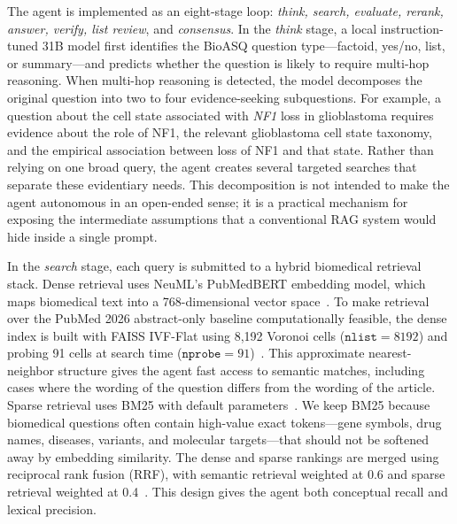 \documentclass[sigconf,nonacm]{acmart}
\begin{document}
The agent is implemented as an eight-stage loop: \emph{think, search, evaluate, rerank, answer, verify, list review}, and \emph{consensus}. In the \emph{think} stage, a local instruction-tuned 31B model first identifies the BioASQ question type---factoid, yes/no, list, or summary---and predicts whether the question is likely to require multi-hop reasoning. When multi-hop reasoning is detected, the model decomposes the original question into two to four evidence-seeking subquestions. For example, a question about the cell state associated with \emph{NF1} loss in glioblastoma requires evidence about the role of NF1, the relevant glioblastoma cell state taxonomy, and the empirical association between loss of NF1 and that state. Rather than relying on one broad query, the agent creates several targeted searches that separate these evidentiary needs. This decomposition is not intended to make the agent autonomous in an open-ended sense; it is a practical mechanism for exposing the intermediate assumptions that a conventional RAG system would hide inside a single prompt.

In the \emph{search} stage, each query is submitted to a hybrid biomedical retrieval stack. Dense retrieval uses NeuML's PubMedBERT embedding model, which maps biomedical text into a 768-dimensional vector space~\cite{neuml_embeddings}. To make retrieval over the PubMed 2026 abstract-only baseline computationally feasible, the dense index is built with FAISS IVF-Flat using 8,192 Voronoi cells ($\texttt{nlist}=8192$) and probing 91 cells at search time ($\texttt{nprobe}=91$)~\cite{faiss}. This approximate nearest-neighbor structure gives the agent fast access to semantic matches, including cases where the wording of the question differs from the wording of the article. Sparse retrieval uses BM25 with default parameters~\cite{robertson2009bm25}. We keep BM25 because biomedical questions often contain high-value exact tokens---gene symbols, drug names, diseases, variants, and molecular targets---that should not be softened away by embedding similarity. The dense and sparse rankings are merged using reciprocal rank fusion (RRF), with semantic retrieval weighted at 0.6 and sparse retrieval weighted at 0.4~\cite{cormack2009rrf}. This design gives the agent both conceptual recall and lexical precision.
\end{document}

